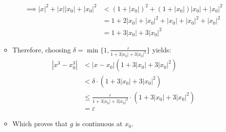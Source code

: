 \documentclass[10pt,a4paper]{article}
\theoremstyle{definition}
\begin{document}
\begin{enumerate}[label = (\alph*)]
\begin{itemize}
\begin{align*}
	\implies |x|^2 + |x||x_0| + |x_0|^2 &< (1 + |x_0|)^2 + (1 + |x_0|)|x_0| + |x_0|^2\\
	&= 1 + 2|x_0| + |x_0|^2 + |x_0| + |x_0|^2 + |x_0|^2\\
	&= 1 + 3|x_0| + 3|x_0|^2
	\end{align*}
	\item Therefore, choosing $\delta = \min\{1, \frac{\varepsilon}{1 + 3|x_0| + 3|x_0|^2}\}$ yields:
	\begin{align*}
	|x^3 - x_0^3| &< |x - x_0|(1 + 3|x_0| + 3|x_0|^2)\\
	&< \delta \cdot (1 + 3|x_0| + 3|x_0|^2)\\
	&\leq \frac{\varepsilon}{1 + 3|x_0| + 3|x_0|^2} \cdot (1 + 3|x_0| + 3|x_0|^2)\\
	&= \varepsilon
	\end{align*}
	\item Which proves that $g$ is continuous at $x_0$.
	\end{itemize}
\end{enumerate}
\end{document}

